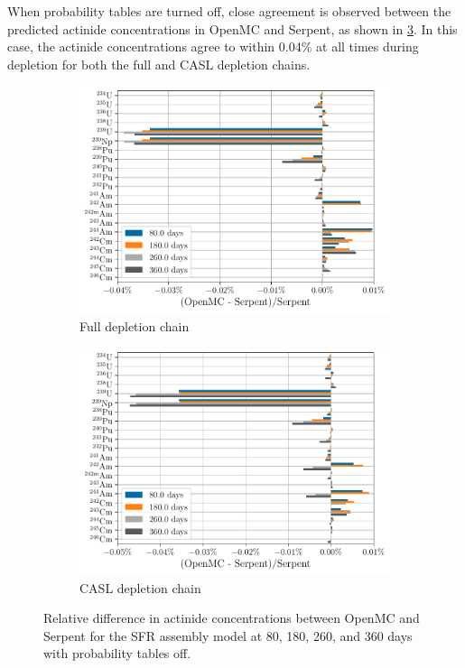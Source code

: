 \documentclass[3p,authoryear]{elsarticle}
\begin{document}
When probability tables are turned off, close agreement is observed between
the predicted actinide concentrations in OpenMC and Serpent, as shown in
\cref{fig:sfr-actinides-nop}. In this case, the actinide concentrations agree to
within 0.04\% at all times during depletion for both the full and CASL depletion
chains.
\begin{figure}[H]
  \centering
  \begin{subfigure}[t]{0.45\textwidth}
    \includegraphics[width=\textwidth]{figures/sfr_actinides_full_nop.pdf}
    \caption{Full depletion chain}
    \label{fig:sfr-actinides-full-nop}
  \end{subfigure}
  \hspace{0.05\textwidth}
  \begin{subfigure}[t]{0.45\textwidth}
    \includegraphics[width=\textwidth]{figures/sfr_actinides_casl_nop.pdf}
    \caption{CASL depletion chain}
    \label{fig:sfr-actinides-casl-nop}
  \end{subfigure}
  \caption{Relative difference in actinide concentrations between OpenMC and
  Serpent for the SFR assembly model at 80, 180, 260, and 360 days with
  probability tables off.}
  \label{fig:sfr-actinides-nop}
\end{figure}
\end{document}
